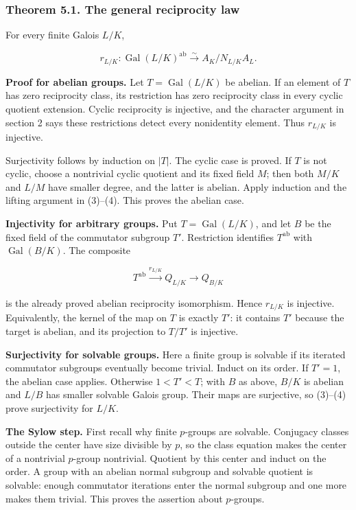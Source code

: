 \documentclass[11pt,a4paper]{article}
\begin{document}
\subsubsection{Theorem 5.1. The general reciprocity
law}\label{theorem-5.1.-the-general-reciprocity-law}

For every finite Galois \(L/K\),

\[
r_{L/K}:\operatorname{Gal}(L/K)^{\mathrm{ab}}
\xrightarrow{\sim} A_K/N_{L/K}A_L.
\tag{6}
\]

\textbf{Proof for abelian groups.} Let \(T=\operatorname{Gal}(L/K)\) be
abelian. If an element of \(T\) has zero reciprocity class, its
restriction has zero reciprocity class in every cyclic quotient
extension. Cyclic reciprocity is injective, and the character argument
in section 2 says these restrictions detect every nonidentity element.
Thus \(r_{L/K}\) is injective.

Surjectivity follows by induction on \(|T|\). The cyclic case is proved.
If \(T\) is not cyclic, choose a nontrivial cyclic quotient and its
fixed field \(M\); then both \(M/K\) and \(L/M\) have smaller degree,
and the latter is abelian. Apply induction and the lifting argument in
(3)--(4). This proves the abelian case.

\textbf{Injectivity for arbitrary groups.} Put
\(T=\operatorname{Gal}(L/K)\), and let \(B\) be the fixed field of the
commutator subgroup \(T'\). Restriction identifies \(T^{\mathrm{ab}}\)
with \(\operatorname{Gal}(B/K)\). The composite

\[
T^{\mathrm{ab}}\xrightarrow{r_{L/K}}Q_{L/K}
\longrightarrow Q_{B/K}
\]

is the already proved abelian reciprocity isomorphism. Hence \(r_{L/K}\)
is injective. Equivalently, the kernel of the map on \(T\) is exactly
\(T'\): it contains \(T'\) because the target is abelian, and its
projection to \(T/T'\) is injective.

\textbf{Surjectivity for solvable groups.} Here a finite group is
solvable if its iterated commutator subgroups eventually become trivial.
Induct on its order. If \(T'=1\), the abelian case applies. Otherwise
\(1<T'<T\); with \(B\) as above, \(B/K\) is abelian and \(L/B\) has
smaller solvable Galois group. Their maps are surjective, so (3)--(4)
prove surjectivity for \(L/K\).

\textbf{The Sylow step.} First recall why finite \(p\)-groups are
solvable. Conjugacy classes outside the center have size divisible by
\(p\), so the class equation makes the center of a nontrivial
\(p\)-group nontrivial. Quotient by this center and induct on the order.
A group with an abelian normal subgroup and solvable quotient is
solvable: enough commutator iterations enter the normal subgroup and one
more makes them trivial. This proves the assertion about \(p\)-groups.
\end{document}
